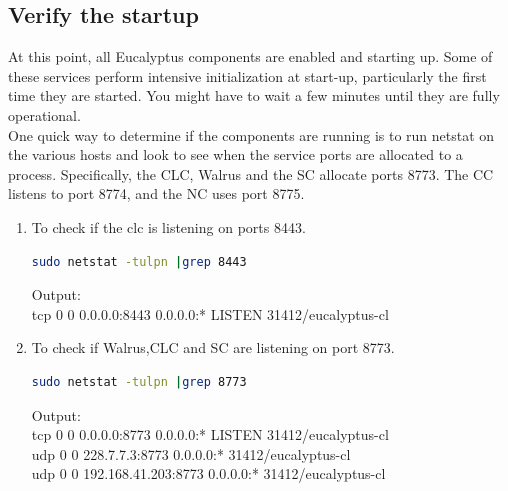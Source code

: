 \subsection{Verify the startup}
At this point, all Eucalyptus components are enabled and starting up. Some of these services perform intensive initialization at start-up, particularly the first time they are started. You might have to wait a few minutes until they are fully operational.
\\ \linebreak
One quick way to determine if the components are running is to run netstat on the various hosts and look to see when the service ports are allocated to a process. Specifically, the CLC, Walrus and the SC allocate ports 8773. The CC listens to port 8774, and the NC uses port 8775.
\begin{enumerate}
\item To check if the clc is listening on ports 8443.
\begin{lstlisting}[language=bash]
sudo netstat -tulpn |grep 8443
\end{lstlisting}
Output: \\
tcp \hspace{6mm} 0 \hspace{6mm}     0 0.0.0.0:8443 \hspace{6mm}   0.0.0.0:* \hspace{6mm} LISTEN 31412/eucalyptus-cl 
\item To check if Walrus,CLC and SC are listening on port 8773.
\begin{lstlisting}[language=bash]
sudo netstat -tulpn |grep 8773
\end{lstlisting}
Output:\\
tcp   \hspace{6mm}     0 \hspace{6mm}     0 0.0.0.0:8773 \hspace{6mm}               0.0.0.0:*                  \hspace{6mm} LISTEN   \hspace{6mm}   31412/eucalyptus-cl  \\
udp    \hspace{6mm}    0  \hspace{6mm}    0 228.7.7.3:8773  \hspace{6mm}            0.0.0.0:*                              \hspace{6mm} 31412/eucalyptus-cl \\
udp    \hspace{6mm}    0  \hspace{6mm}    0 192.168.41.203:8773 \hspace{6mm}        0.0.0.0:*                              \hspace{6mm} 31412/eucalyptus-cl

\end{enumerate}
